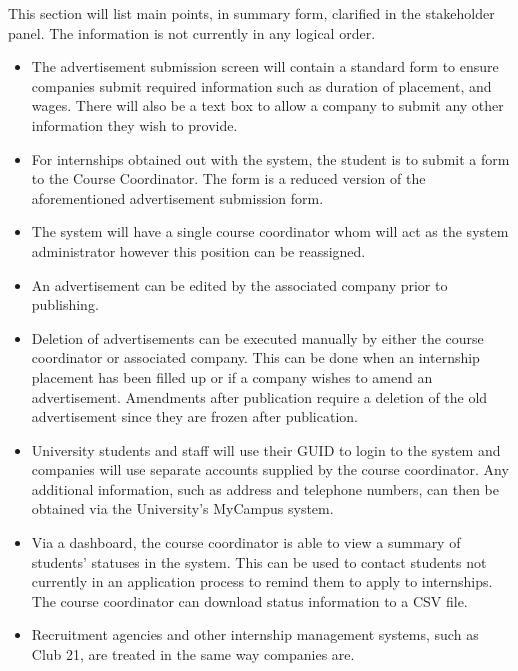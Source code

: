 \documentclass{l3deliverable}
\begin{document}
This section will list main points, in summary form, clarified in the
stakeholder panel. The information is not currently in any logical order.

\begin{itemize}

\item The advertisement submission screen will contain a standard form to
ensure companies submit required information such as duration of placement, and
wages. There will also be a text box to allow a company to submit any other
information they wish to provide.

\item For internships obtained out with the system, the student is to submit
a form to the Course Coordinator. The form is a reduced version of the
aforementioned advertisement submission form.

\item The system will have a single course coordinator whom will act as
the system administrator however this position can be reassigned.

\item An advertisement can be edited by the associated company prior to
publishing.

\item Deletion of advertisements can be executed manually by either the course
coordinator or associated company. This can be done when an internship placement
has been filled up or if a company wishes to amend an advertisement. Amendments
after publication require a deletion of the old advertisement since they are
frozen after publication.

\item University students and staff will use their GUID to login to the system
and companies will use separate accounts supplied by the course coordinator.
Any additional information, such as address and telephone numbers, can then
be obtained via the University's MyCampus system.

\item Via a dashboard, the course coordinator is able to view a summary of
students' statuses in the system. This can be used to contact students not
currently in an application process to remind them to apply to internships. The
course coordinator can download status information to a CSV file.

\item Recruitment agencies and other internship management systems, such as
Club 21, are treated in the same way companies are.


\end{itemize}
\end{document}
